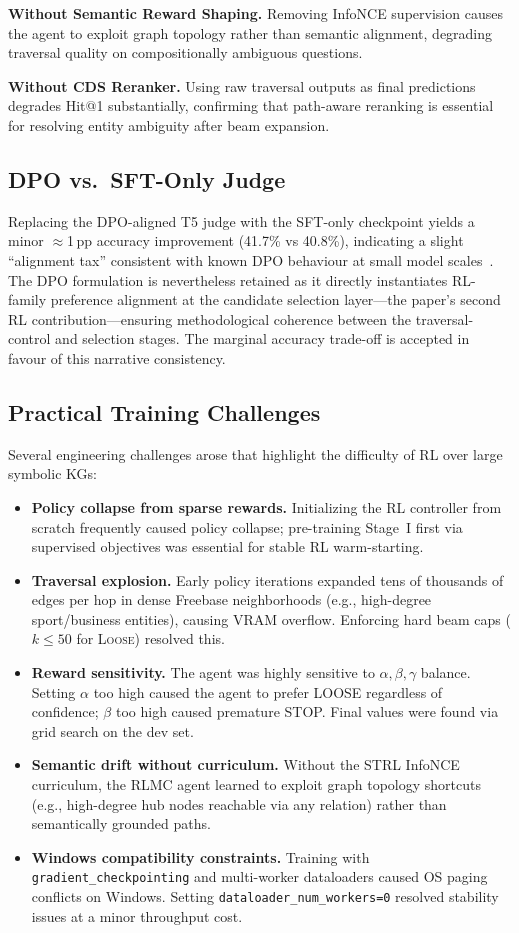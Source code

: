 \documentclass[10pt,conference]{IEEEtran}
\begin{document}
\textbf{Without Semantic Reward Shaping.} Removing InfoNCE supervision causes the agent to exploit graph topology rather than semantic alignment, degrading traversal quality on compositionally ambiguous questions.

\textbf{Without CDS Reranker.} Using raw traversal outputs as final predictions degrades Hit@1 substantially, confirming that path-aware reranking is essential for resolving entity ambiguity after beam expansion.

\subsection{DPO vs.\ SFT-Only Judge}

Replacing the DPO-aligned T5 judge with the SFT-only checkpoint yields a minor $\approx$1\,pp accuracy improvement (41.7\% vs 40.8\%), indicating a slight ``alignment tax'' consistent with known DPO behaviour at small model scales~\cite{rafailov2023direct}. The DPO formulation is nevertheless retained as it directly instantiates RL-family preference alignment at the candidate selection layer—the paper's second RL contribution—ensuring methodological coherence between the traversal-control and selection stages. The marginal accuracy trade-off is accepted in favour of this narrative consistency.

\subsection{Practical Training Challenges}

Several engineering challenges arose that highlight the difficulty of RL over large symbolic KGs:
\begin{itemize}
  \item \textbf{Policy collapse from sparse rewards.} Initializing the RL controller from scratch frequently caused policy collapse; pre-training Stage~I first via supervised objectives was essential for stable RL warm-starting.
  \item \textbf{Traversal explosion.} Early policy iterations expanded tens of thousands of edges per hop in dense Freebase neighborhoods (e.g., high-degree sport/business entities), causing VRAM overflow. Enforcing hard beam caps ($k \le 50$ for \textsc{Loose}) resolved this.
  \item \textbf{Reward sensitivity.} The agent was highly sensitive to $\alpha,\beta,\gamma$ balance. Setting $\alpha$ too high caused the agent to prefer LOOSE regardless of confidence; $\beta$ too high caused premature STOP. Final values were found via grid search on the dev set.
  \item \textbf{Semantic drift without curriculum.} Without the STRL InfoNCE curriculum, the RLMC agent learned to exploit graph topology shortcuts (e.g., high-degree hub nodes reachable via any relation) rather than semantically grounded paths.
  \item \textbf{Windows compatibility constraints.} Training with \texttt{gradient\_checkpointing} and multi-worker dataloaders caused OS paging conflicts on Windows. Setting \texttt{dataloader\_num\_workers=0} resolved stability issues at a minor throughput cost.
\end{itemize}
\end{document}
